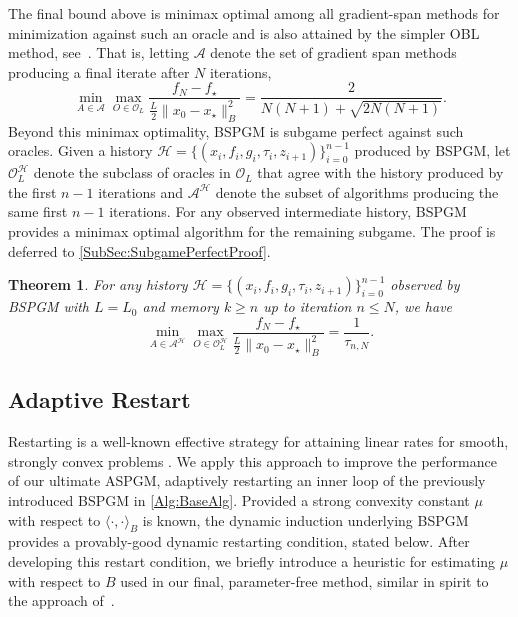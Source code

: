 \documentclass[11pt]{article}
\numberwithin{equation}{section}
\newtheorem{theorem}[thm]{Theorem}
\newcommand{\Mem}{\mathcal{H}}
\theoremstyle{definition}
\theoremstyle{plain}
\theoremstyle{definition}
\begin{document}
The final bound above is minimax optimal among all gradient-span methods for minimization against such an oracle and is also attained by the simpler OBL method, see~\cite[Theorem 4]{OBL}. That is, letting $\mathcal{A}$ denote the set of gradient span methods producing a final iterate after $N$ iterations,
\begin{equation*}
    \min_{A\in\mathcal{A}} \max_{O\in\mathcal{O}_L} \frac{f_N - f_\star}{\frac{L}{2}\|x_0-x_\star\|^2_B} = \frac{2}{N(N+1) + \sqrt{2N(N+1)} }.
\end{equation*}
Beyond this minimax optimality, BSPGM is subgame perfect against such oracles. Given a history $\Mem = \{(x_i,f_i,g_i,\tau_i,z_{i+1})\}_{i=0}^{n-1}$ produced by BSPGM, let $\mathcal{O}^\mathcal{H}_L$ denote the subclass of oracles in $\mathcal{O}_L$ that agree with the history produced by the first $n-1$ iterations and $\mathcal{A}^\mathcal{H}$ denote the subset of algorithms producing the same first $n-1$ iterations. For any observed intermediate history, BSPGM provides a minimax optimal algorithm for the remaining subgame. The proof is deferred to \cref{SubSec:SubgamePerfectProof}.
\begin{theorem} \label{Thm:SubgamePerfect}
    For any history $\mathcal{H} = \{(x_i,f_i,g_i,\tau_i,z_{i+1})\}_{i=0}^{n-1}$ observed by BSPGM with $L=L_0$ and memory $k\geq n$ up to iteration $n\leq N$, we have
    $$ \min_{A\in\mathcal{A}^\mathcal{H}} \max_{O\in\mathcal{O}^\mathcal{H}_L} \frac{f_N - f_\star}{\frac{L}{2}\|x_0-x_\star\|^2_B} = \frac{1}{\tau_{n,N}}. $$
\end{theorem}

\subsection{Adaptive Restart} \label{SubSec:AdRestart}
Restarting is a well-known effective strategy for attaining linear rates for smooth, strongly convex problems \cite{Restart_Nemirovskii,AdaptiveRestart_ODonoghue}.  We apply this approach to improve the performance of our ultimate ASPGM, adaptively restarting an inner loop of the previously introduced BSPGM in \cref{Alg:BaseAlg}. Provided a strong convexity constant $\mu$ with respect to $\langle \cdot,\cdot \rangle_B$ is known, the dynamic induction underlying BSPGM provides a provably-good dynamic restarting condition, stated below. After developing this restart condition, we briefly introduce a heuristic for estimating $\mu$ with respect to $B$ used in our final, parameter-free method, similar in spirit to the approach of~\cite{NAGFree_Cavalcanti}.
\end{document}
